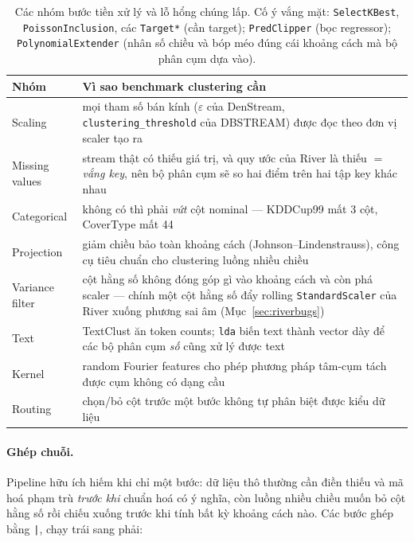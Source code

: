 \documentclass[11pt,a4paper]{article}
\theoremstyle{remark}
\begin{document}
\begin{table}[htbp]
\centering
\small
\caption{Các nhóm bước tiền xử lý và lỗ hổng chúng lấp. Cố ý vắng mặt:
\texttt{SelectKBest}, \texttt{PoissonInclusion}, các \texttt{Target*} (cần
target); \texttt{PredClipper} (bọc regressor); \texttt{PolynomialExtender} (nhân
số chiều và bóp méo đúng cái khoảng cách mà bộ phân cụm dựa vào).}
\label{tab:preproc}
\begin{tabular}{@{}lp{8.4cm}@{}}
\toprule
\textbf{Nhóm} & \textbf{Vì sao benchmark clustering cần} \\
\midrule
Scaling & mọi tham số bán kính ($\varepsilon$ của DenStream,
\texttt{clustering\_threshold} của DBSTREAM) được đọc theo đơn vị scaler tạo ra \\
Missing values & stream thật có thiếu giá trị, và quy ước của River là thiếu
$=$ \emph{vắng key}, nên bộ phân cụm sẽ so hai điểm trên hai tập key khác nhau \\
Categorical & không có thì phải \emph{vứt} cột nominal --- KDDCup99 mất 3 cột,
CoverType mất 44 \\
Projection & giảm chiều bảo toàn khoảng cách (Johnson--Lindenstrauss), công cụ
tiêu chuẩn cho clustering luồng nhiều chiều \\
Variance filter & cột hằng số không đóng góp gì vào khoảng cách và còn phá
scaler --- chính một cột hằng số đẩy rolling \texttt{StandardScaler} của River
xuống phương sai âm (Mục~\ref{sec:riverbugs}) \\
Text & TextClust ăn token counts; \texttt{lda} biến text thành vector dày để các
bộ phân cụm \emph{số} cũng xử lý được text \\
Kernel & random Fourier features cho phép phương pháp tâm-cụm tách được cụm
không có dạng cầu \\
Routing & chọn/bỏ cột trước một bước không tự phân biệt được kiểu dữ liệu \\
\bottomrule
\end{tabular}
\end{table}

\paragraph{Ghép chuỗi.}
Pipeline hữu ích hiếm khi chỉ một bước: dữ liệu thô thường cần điền thiếu và mã
hoá phạm trù \emph{trước khi} chuẩn hoá có ý nghĩa, còn luồng nhiều chiều muốn
bỏ cột hằng số rồi chiếu xuống trước khi tính bất kỳ khoảng cách nào. Các bước
ghép bằng \texttt{|}, chạy trái sang phải:
\end{document}
